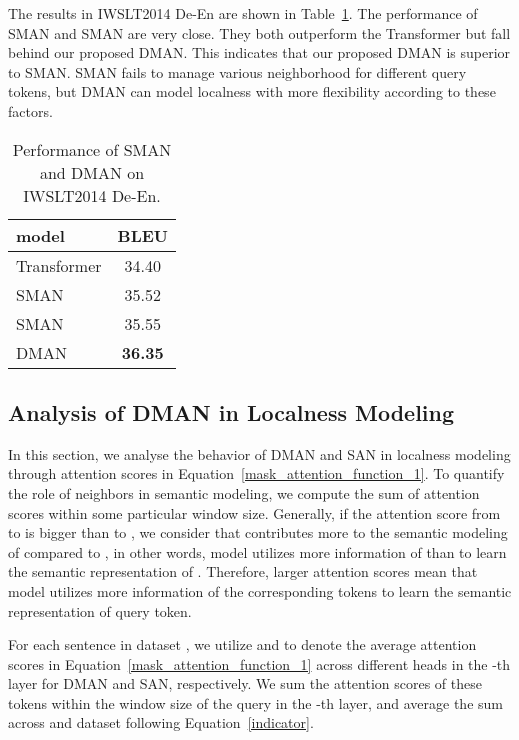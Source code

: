 \documentclass[11pt]{article}
\begin{document}
The results in IWSLT2014 De-En are shown in Table~\ref{static-ablation-result}. The performance of SMAN and SMAN are very close. They both outperform the Transformer but fall behind our proposed DMAN. 
This indicates that our proposed DMAN is superior to SMAN. SMAN fails to manage various neighborhood for different query tokens, but DMAN can model localness with more flexibility according to these factors.

\begin{table}
\begin{center}
\begin{tabular}{lc}
\midrule[1.0pt]
model &BLEU \\
\midrule[1.0pt]
Transformer  &34.40 \\
SMAN &35.52 \\
SMAN &35.55 \\
DMAN &\textbf{36.35}\\
\midrule[1.0pt]
\end{tabular}
\end{center}
\caption{Performance of SMAN and DMAN on IWSLT2014 De-En.}
\label{static-ablation-result}
\end{table}

\subsection{Analysis of DMAN in Localness Modeling}
\label{Analysis_of_DMAN_in_Localness_Modeling}
In this section, we analyse the behavior of DMAN and SAN in localness modeling through attention scores in Equation~\ref{mask_attention_function_1}. To quantify the role of neighbors in semantic modeling, we compute the sum of attention scores within some particular window size.  Generally, if the attention score from  to  is bigger than  to , we consider that  contributes more to the semantic modeling of  compared to , in other words, 
model utilizes more information of  than  to learn the semantic representation of . Therefore, larger attention scores mean that model utilizes more information of the corresponding tokens to learn the semantic representation of query token. 

For each sentence in dataset  , we utilize  and  to denote the average attention scores  in Equation~\ref{mask_attention_function_1} across different heads in the -th layer for DMAN and SAN, respectively. We sum the attention scores of these tokens  within the window size  of the query  in the -th layer, and average the sum across  and dataset  following Equation~\ref{indicator}.
\end{document}
